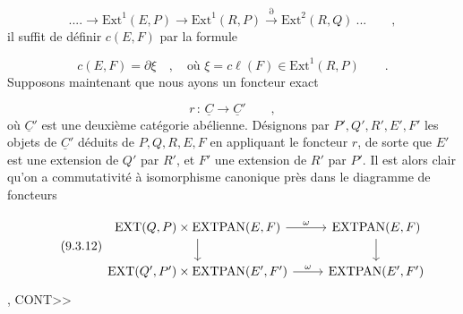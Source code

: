 \begin{equation*}
.... \longrightarrow \mathrm{Ext}^1(E,P) \longrightarrow \mathrm{Ext}^1(R,P) \stackrel{\partial}{\longrightarrow} \mathrm{Ext}^2(R,Q) \ ... \qquad ,
\end{equation*}
il suffit de définir $c(E,F)$ par la formule

\begin{equation}\tag{9.3.10}
c(E,F) = \partial \xi \quad , \quad \mbox{où } \xi = c\ell(F) \in \mathrm{Ext}^1(R,P) \qquad .
\end{equation}
Supposons maintenant que nous ayons un foncteur exact

\begin{equation}\tag{9.3.11}
r \,:\, \underline{C} \longrightarrow \underline{C}{}' \qquad ,
\end{equation}
où $\underline{C}{}'$ est une deuxième catégorie abélienne. Désignons par $P',Q',R',E',F'$ les objets de $\underline{C}{}'$ déduits de $P,Q,R,E,F$ en appliquant le foncteur $r$, de sorte que $E'$ est une extension de $Q'$ par $R'$, et $F'$ une extension de $R'$ par $P'$. Il est alors clair qu'on a commutativité à isomorphisme canonique près dans le diagramme de foncteurs

\begin{equation}\tag{9.3.12}
\begin{tikzcd}
\mathrm{EXT}(Q,P) \times \mathrm{EXTPAN}(E,F) \arrow[r, "\omega"] \arrow[d] & \mathrm{EXTPAN}(E,F) \arrow[d] \\
\mathrm{EXT}(Q',P') \times \mathrm{EXTPAN}(E',F') \arrow[r, "\omega"] & \mathrm{EXTPAN}(E',F')
\end{tikzcd}
\end{equation}
, CONT>>


